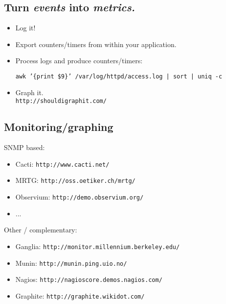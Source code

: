 \documentclass[xga]{xdvislides}
\begin{document}
\subsection{Turn {\em events} into {\em metrics.}}
\begin{itemize}
	\item Log it!
\end{itemize}

\addvspace{.5in}
\begin{itemize}
	\item Export counters/timers from within your application.
	\item Process logs and produce counters/timers:
\begin{verbatim}
awk ’{print $9}’ /var/log/httpd/access.log | sort | uniq -c
\end{verbatim}
\end{itemize}

\addvspace{.5in}
\begin{itemize}
	\item Graph it. \\
	{\tt http://shouldigraphit.com/}
\end{itemize}

\subsection{Monitoring/graphing}
SNMP based:
\begin{itemize}
	\item Cacti: \verb+http://www.cacti.net/+
	\item MRTG: \verb+http://oss.oetiker.ch/mrtg/+
	\item Observium: \verb+http://demo.observium.org/+
	\item ...
\end{itemize}
\vspace{.2in}
Other / complementary:
\begin{itemize}
	\item Ganglia: \verb+http://monitor.millennium.berkeley.edu/+
	\item Munin: \verb+http://munin.ping.uio.no/+
	\item Nagios: \verb+http://nagioscore.demos.nagios.com/+
	\item Graphite: \verb+http://graphite.wikidot.com/+
\end{itemize}
\vspace{.5in}
\end{document}
